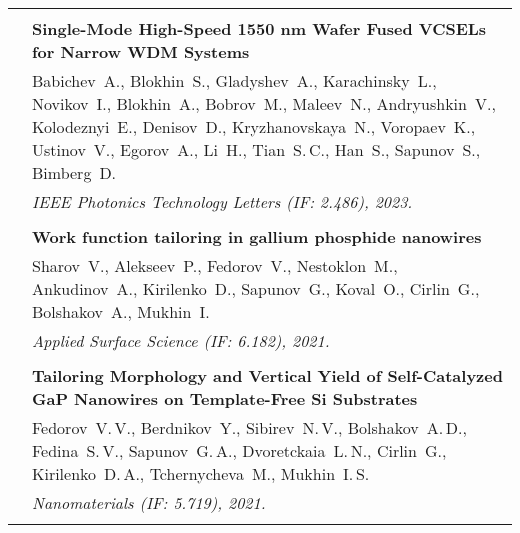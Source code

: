 \documentclass[letterpaper, 11pt]{article}
\begin{document}
\begin{longtable}{p{1.3in}p{4.8in}}
		
		
		\nohyphens{\color{OliveGreen}{Q1 Publications}} \\
        & \textbf{Single-Mode High-Speed 1550 nm Wafer Fused VCSELs for Narrow
        WDM Systems} \\
        & Babichev~A., Blokhin~S., Gladyshev~A., Karachinsky~L., Novikov~I.,
        Blokhin~A., Bobrov~M., Maleev~N., Andryushkin~V., Kolodeznyi~E.,
        Denisov~D., Kryzhanovskaya~N., Voropaev~K., Ustinov~V., Egorov~A.,
        Li~H., Tian~S.\,C., Han~S., Sapunov~S., Bimberg~D.
        \\
        & \textit{IEEE Photonics Technology Letters (IF: 2.486), 2023.}\\
		& \\

        & \textbf{Work function tailoring in gallium phosphide nanowires} \\
        & Sharov~V., Alekseev~P., Fedorov~V., Nestoklon~M., Ankudinov~A.,
        Kirilenko~D., Sapunov~G., Koval~O., Cirlin~G., Bolshakov~A., Mukhin~I.
        \\
        & \textit{Applied Surface Science (IF: 6.182), 2021.}\\
		& \\

        & \textbf{Tailoring Morphology and Vertical Yield of Self-Catalyzed GaP
        Nanowires on Template-Free Si Substrates} \\
        & Fedorov~V.\,V., Berdnikov~Y., Sibirev~N.\,V., Bolshakov~A.\,D.,
        Fedina~S.\,V., Sapunov~G.\,A., Dvoretckaia~L.\,N., Cirlin~G.,
        Kirilenko~D.\,A., Tchernycheva~M., Mukhin~I.\,S. \\
		& \textit{Nanomaterials (IF: 5.719), 2021.}\\
		& \\


\end{longtable}
\end{document}
